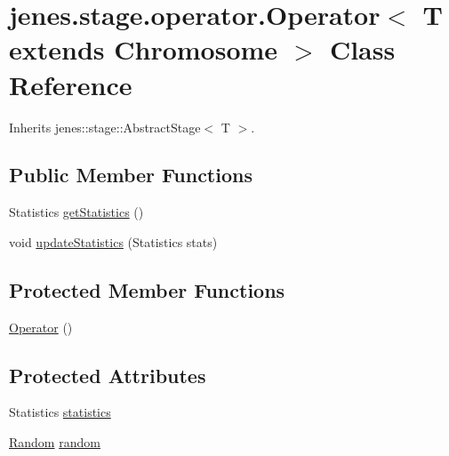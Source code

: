 \hypertarget{classjenes_1_1stage_1_1operator_1_1_operator_3_01_t_01extends_01_chromosome_01_4}{
\section{jenes.stage.operator.Operator$<$ T extends Chromosome $>$ Class Reference}
\label{classjenes_1_1stage_1_1operator_1_1_operator_3_01_t_01extends_01_chromosome_01_4}
}
Inherits jenes::stage::AbstractStage$<$ T $>$.

\subsection*{Public Member Functions}
\begin{CompactItemize}
\item 
Statistics \hyperlink{classjenes_1_1stage_1_1operator_1_1_operator_3_01_t_01extends_01_chromosome_01_4_bf64e7c4d53509dd770fa09ca9cf377d}{getStatistics} ()
\item 
void \hyperlink{classjenes_1_1stage_1_1operator_1_1_operator_3_01_t_01extends_01_chromosome_01_4_11ffd92acef6de663583899707cbbab9}{updateStatistics} (Statistics stats)
\end{CompactItemize}
\subsection*{Protected Member Functions}
\begin{CompactItemize}
\item 
\hyperlink{classjenes_1_1stage_1_1operator_1_1_operator_3_01_t_01extends_01_chromosome_01_4_23b4b18468c2fa30bd89fa9e962f6eb8}{Operator} ()
\end{CompactItemize}
\subsection*{Protected Attributes}
\begin{CompactItemize}
\item 
Statistics \hyperlink{classjenes_1_1stage_1_1operator_1_1_operator_3_01_t_01extends_01_chromosome_01_4_45afa214a1e9109845c8f67165942675}{statistics}
\item 
\hyperlink{classjenes_1_1utils_1_1_random}{Random} \hyperlink{classjenes_1_1stage_1_1operator_1_1_operator_3_01_t_01extends_01_chromosome_01_4_f8cbd8837ce95101e238bdcc3dce5573}{random}
\end{CompactItemize}
